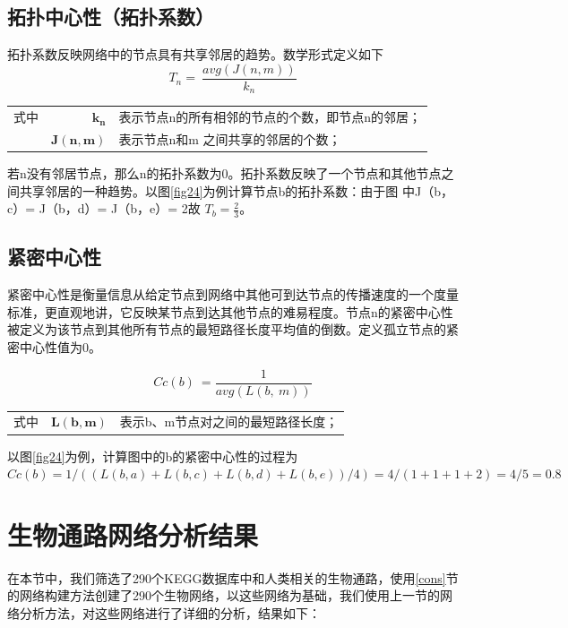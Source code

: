 \subsection{拓扑中心性（拓扑系数）}
拓扑系数反映网络中的节点具有共享邻居的趋势。数学形式定义如下
\begin{equation}\label{eq25}
	T_{n} =\ \frac{avg( J( n,m))}{k_{n}}
\end{equation}
\begin{tabularx}{\textwidth}{@{}l@{\quad}r@{———}X@{}}
式中 & $\boldsymbol{k_{n}}$ &  表示节点n的所有相邻的节点的个数，即节点n的邻居；\\
	& $\boldsymbol{ J( n,m)}$ &   表示节点n和m  之间共享的邻居的个数；\\
\end{tabularx}\vspace{3.15bp}
若n没有邻居节点，那么n的拓扑系数为0。拓扑系数反映了一个节点和其他节点之间共享邻居的一种趋势。以图\ref{fig24}为例计算节点b的拓扑系数：由于图 中J（b，c）= J（b，d）= J（b，e）= 2故 $T_{b}=\frac{2}{3}$。


\subsection{紧密中心性}
紧密中心性是衡量信息从给定节点到网络中其他可到达节点的传播速度的一个度量标准，更直观地讲，它反映某节点到达其他节点的难易程度。节点n的紧密中心性被定义为该节点到其他所有节点的最短路径长度平均值的倒数。定义孤立节点的紧密中心性值为0。

\begin{equation}\label{eq27}
	Cc( b) \ =\frac{1}{avg( L( b,\ m))}
\end{equation}

\begin{tabularx}{\textwidth}{@{}l@{\quad}r@{———}X@{}}
式中 & $\boldsymbol{L(b, m)}$ &  表示b、m节点对之间的最短路径长度；\\
\end{tabularx}\vspace{3.15bp}
以图\ref{fig24}为例，计算图中的b的紧密中心性的过程为$Cc(b) = 1/ ( (L(b, a) + L(b, c) + L(b, d) + L(b, e)) / 4) = 4/ (1 + 1 + 1 + 2) = 4/5= 0.8$

\section{生物通路网络分析结果}
在本节中，我们筛选了290个KEGG\cite{kanehisa2008kegg}数据库中和人类相关的生物通路，使用\ref{cons}节的网络构建方法创建了290个生物网络，以这些网络为基础，我们使用上一节的网络分析方法，对这些网络进行了详细的分析，结果如下：
